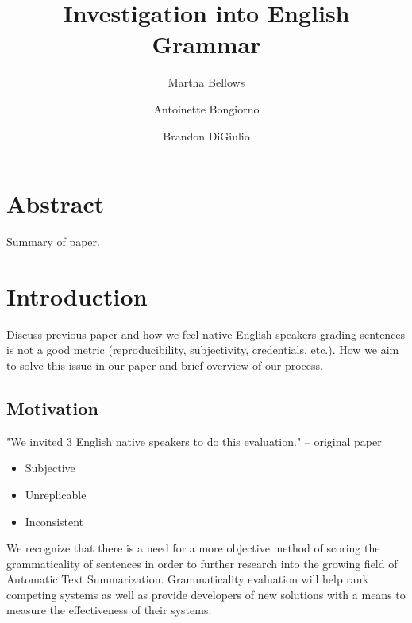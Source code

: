 \documentclass[12pt,a4paper]{article}
\title{Investigation into English Grammar}
\author{
        Martha Bellows 
\and
        Antoinette Bongiorno
\and 
	Brandon DiGiulio
}
\begin{document}
\maketitle

\section{Abstract}
Summary of paper. 

\pagebreak

\section{Introduction}
Discuss previous paper and how we feel native English speakers grading sentences is not a good metric (reproducibility, subjectivity, credentials, etc.). How we aim to solve this issue in our paper and brief overview of our process.


\subsection{Motivation}
"We invited 3 English native speakers to do this evaluation." -- original paper 
\begin{itemize}
  \item Subjective
  \item Unreplicable
  \item Inconsistent
\end{itemize}

We recognize that there is a need for a more objective method of scoring the grammaticality of sentences in order to further research into the growing field of Automatic Text Summarization.
Grammaticality evaluation will help rank competing systems as well as provide developers of new solutions with a means to measure the effectiveness of their systems.\\
\end{document}
